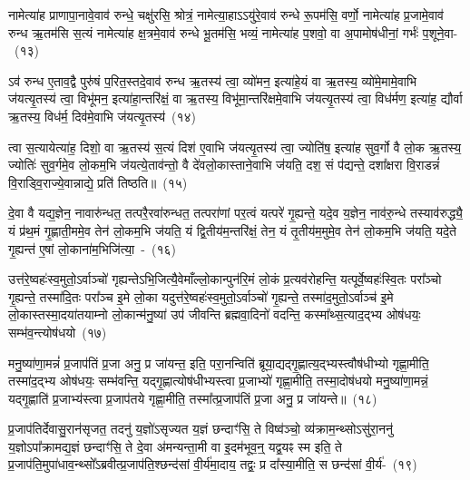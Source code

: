 नामेत्या॑ह प्राणापा॒नावे॒वाव॑ रुन्धे॒ चक्षु॑रसि॒ श्रोत्रं॒ नामेत्या॒हा\-ऽऽ\-यु॑रे॒वाव॑ रुन्धे रू॒पम॑सि॒ वर्णो॒ नामेत्या॑ह प्र॒जामे॒वाव॑ रुन्ध ऋ॒तम॑सि स॒त्यं नामेत्या॑ह क्ष॒त्रमे॒वाव॑ रुन्धे भू॒तम॑सि॒ भव्यं॒ नामेत्या॑ह प॒शवो॒ वा अ॒पामोष॑धीनां॒ गर्भः॑ प॒शूने॒वा-~(१३)\ip

ऽव॑ रुन्ध ए॒ताव॒द्वै पुरु॑षं प॒रित॒स्तदे॒वाव॑ रुन्ध ऋ॒तस्य॑ त्वा॒ व्यो॑मन॒ इत्या॑हे॒यं वा ऋ॒तस्य॒ व्यो॑मे॒मामे॒वाभि ज॑यत्यृ॒तस्य॑ त्वा॒ विभू॑मन॒ इत्या॑हा॒न्तरि॑क्षं॒ वा ऋ॒तस्य॒ विभू॑मा॒न्तरि॑क्षमे॒वाभि ज॑यत्यृ॒तस्य॑ त्वा॒ विध॑र्मण॒ इत्या॑ह॒ द्यौर्वा ऋ॒तस्य॒ विध॑र्म॒ दिव॑मे॒वाभि ज॑यत्यृ॒तस्य॑~(१४)\ip

त्वा स॒त्यायेत्या॑ह॒ दिशो॒ वा ऋ॒तस्य॑ स॒त्यं दिश॑ ए॒वाभि ज॑यत्यृ॒तस्य॑ त्वा॒ ज्योति॑ष॒ इत्या॑ह सुव॒र्गो वै लो॒क ऋ॒तस्य॒ ज्योतिः॑ सुव॒र्गमे॒व लो॒कम॒भि ज॑यत्ये॒ताव॑न्तो॒ वै दे॑वलो॒कास्ताने॒वाभि ज॑यति॒ दश॒ सं प॑द्यन्ते॒ दशा᳚क्षरा वि॒राडन्नं॑ वि॒राड्वि॒राज्ये॒वान्नाद्ये॒ प्रति॑ तिष्ठति॥~(१५)\ip

{\anuvakamend[{व्यो॑मन ऋ॒तस्य॑ प्रा॒णः प॒शूने॒व विध॑र्म॒ दिव॑मे॒वाभि ज॑यत्यृ॒तस्य॒ षट्च॑त्वारिꣳशच्च}]}

दे॒वा वै यद्य॒ज्ञेन॒ नावारु॑न्धत॒ तत्परै॒रवा॑रुन्धत॒ तत्परा॑णां पर॒त्वं यत्परे॑ गृ॒ह्यन्ते॒ यदे॒व य॒ज्ञेन॒ नाव॑रु॒न्धे तस्याव॑रुद्ध्यै॒ यं प्र॑थ॒मं गृ॒ह्णाती॒ममे॒व तेन॑ लो॒कम॒भि ज॑यति॒ यं द्वि॒तीय॑म॒न्तरि॑क्षं॒ तेन॒ यं तृ॒तीय॑म॒मुमे॒व तेन॑ लो॒कम॒भि ज॑यति॒ यदे॒ते गृ॒ह्यन्त॑ ए॒षां लो॒काना॑म॒भिजि॑त्या॒~-~(१६)\ip

उत्त॑रे॒ष्वहः॑स्व॒मुतो॒\-ऽर्वाञ्चो॑ गृह्यन्ते\-ऽभि॒जित्यै॒वेमाँल्लो॒कान्पुन॑रि॒मं लो॒कं प्र॒त्यव॑रोहन्ति॒ यत्पूर्वे॒ष्वहः॑स्वि॒तः परा᳚ञ्चो गृ॒ह्यन्ते॒ तस्मा॑दि॒तः परा᳚ञ्च इ॒मे लो॒का यदुत्त॑रे॒ष्वहः॑स्व॒मुतो॒\-ऽर्वाञ्चो॑ गृ॒ह्यन्ते॒ तस्मा॑द॒मुतो॒\-ऽर्वाञ्च॑ इ॒मे लो॒कास्तस्मा॒द\-या॑तयाम्नो लो॒कान्म॑नु॒ष्या॑ उप॑ जीवन्ति ब्रह्मवा॒दिनो॑ वदन्ति॒ कस्मा᳚थ्स॒त्याद॒द्भ्य ओष॑धयः॒ सम्भ॑व॒न्त्योष॑धयो~(१७)\ip

मनु॒ष्या॑णा॒मन्नं॑ प्र॒जा\-प॑तिं प्र॒जा अनु॒ प्र जा॑यन्त॒ इति॒ परा॒नन्विति॑ ब्रूया॒द्यद्गृ॒ह्णात्य॒द्भ्यस्त्वौष॑\-धीभ्यो गृह्णा॒मीति॒ तस्मा॑द॒द्भ्य ओष॑धयः॒ सम्भ॑वन्ति॒ यद्गृ॒ह्णात्योष॑धीभ्यस्त्वा प्र॒जाभ्यो॑ गृह्णा॒मीति॒ तस्मा॒दोष॑धयो मनु॒ष्या॑णा॒मन्नं॒ यद्गृ॒ह्णाति॑ प्र॒जाभ्य॑स्त्वा प्र॒जा\-प॑तये गृह्णा॒मीति॒ तस्मा᳚त्प्र॒जा\-प॑तिं प्र॒जा अनु॒ प्र जा॑यन्ते॥~(१८)\ip

{\anuvakamend[{अ॒भिजि॑त्या॒ ओष॑धयो॒\-ऽष्टाच॑त्वारिꣳशच्च}]}

प्र॒जा\-प॑तिर्देवासु॒रान॑सृजत॒ तदनु॑ य॒ज्ञो॑\-ऽसृज्यत य॒ज्ञं छन्दाꣳ॑सि॒ ते विष्व॑ञ्चो॒ व्य॑क्राम॒न्थ्सो\-ऽसु॑रा॒ननु॑ य॒ज्ञो\-ऽपा᳚क्रामद्य॒ज्ञं छन्दाꣳ॑सि॒ ते दे॒वा अ॑मन्यन्ता॒मी वा इ॒दम॑भूव॒न्॒ यद्व॒यꣴ स्म इति॒ ते प्र॒जा\-प॑ति॒मुपा॑धाव॒न्थ्सो᳚\-ऽब्रवीत्प्र॒जा\-प॑ति॒श्छन्द॑सां वी॒र्य॑मा॒दाय॒ तद्वः॒ प्र दा᳚स्या॒मीति॒ स छन्द॑सां वी॒र्य॑-~(१९)\ip

